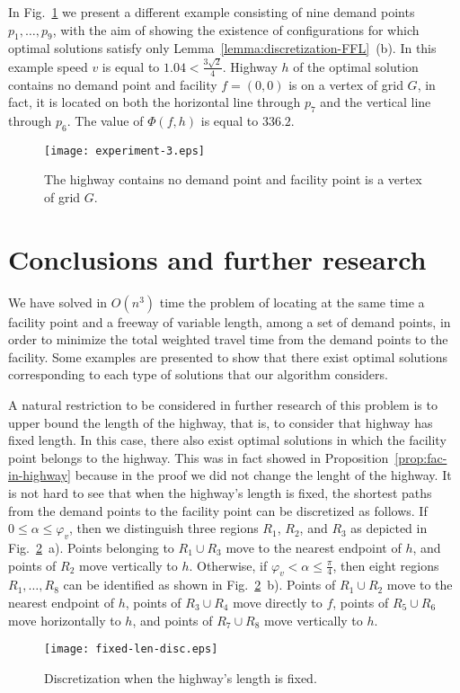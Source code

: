 \documentclass[11pt,a4paper,oneside,onecolumn]{article}
\begin{document}
In Fig.~\ref{fig:experiment3} we present a different example
consisting of nine demand points $p_1,\ldots,p_9$, with the aim of
showing the existence of configurations for which optimal solutions
satisfy only Lemma~\ref{lemma:discretization-FFL}~(b). In this
example speed $v$ is equal to $1.04<\frac{3\sqrt{2}}{4}$. Highway
$h$ of the optimal solution contains no demand point and facility
$f=(0,0)$ is on a vertex of grid $G$, in fact, it is located on both
the horizontal line through $p_7$ and the vertical line through
$p_6$. The value of $\Phi(f,h)$ is equal to $336.2$.

\begin{figure}[h]
  \centering
  \texttt{[image: experiment-3.eps]}
  \caption{\small{The highway contains no demand point and facility point
  is a vertex of grid $G$.}}
  \label{fig:experiment3}
\end{figure}

\section{Conclusions and further research}\label{section:conclu}

We have solved in $O(n^3)$ time the problem of locating at the same
time a facility point and a freeway of variable
length,
among a set of demand points, in order to minimize the total
weighted travel time from the demand points to the facility.
Some examples are presented to show that there exist optimal
solutions corresponding to each type of solutions that our
algorithm considers.

A natural restriction to be considered in further research
of this problem is to upper bound the length of the highway,
that is, to consider that highway has fixed length.
In this case, there also exist optimal solutions in which the facility
point belongs to the highway. This was in fact showed in
Proposition~\ref{prop:fac-in-highway} because in the proof
we did not change the lenght of the highway.
It is not hard to see that when the highway's length is fixed,
the shortest paths from the demand points to the facility point can be
discretized as follows. If $0\leq\alpha\leq\varphi_v$, then we distinguish
three regions $R_1$, $R_2$, and $R_3$ as depicted in
Fig.~\ref{fig:disc-fixed-len}~a). Points belonging to $R_1\cup R_3$
move to the nearest endpoint of $h$,
and points of $R_2$ move vertically to $h$. Otherwise,
if $\varphi_v<\alpha\leq\frac{\pi}{4}$, then eight regions
$R_1,\ldots,R_8$ can be identified as 
shown in Fig.~\ref{fig:disc-fixed-len}~b). Points of
$R_1\cup R_2$ move to the nearest endpoint of $h$, 
points of $R_3\cup R_4$ move directly to $f$, points of $R_5\cup R_6$
move horizontally to $h$, and points of $R_7\cup R_8$ move vertically
to $h$. 
\begin{figure}[h]
  \centering
  \texttt{[image: fixed-len-disc.eps]}
  \caption{\small{Discretization when the highway's length is fixed.}}
  \label{fig:disc-fixed-len}
\end{figure}
\end{document}
